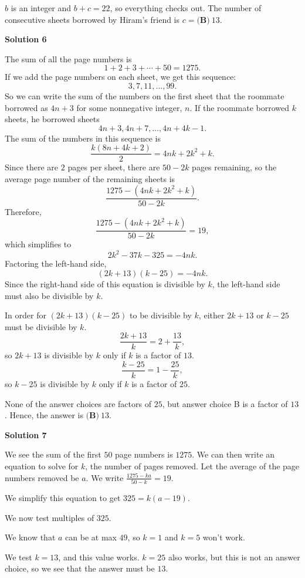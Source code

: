 \begin{enumerate}
 $b$ is an integer and $b+c=22$, so everything checks out. The number of consecutive sheets borrowed by Hiram’s friend is $c=\boxed{\textbf{(B)} ~13}$.

 



\textbf{Solution 6}

The sum of all the page numbers is
 \[1+2+3+\cdots+50 = 1275.\]If we add the page numbers on each sheet, we get this sequence:
 \[3, 7, 11, \ldots, 99.\]So we can write the sum of the numbers on the first sheet that the roommate borrowed as $4n+3$ for some nonnegative integer, $n$. If the roommate borrowed $k$ sheets, he borrowed sheets
 \[4n+3, 4n+7, \ldots, 4n+4k-1.\]The sum of the numbers in this sequence is
 \[\frac{k(8n+4k+2)}{2} = 4nk+2k^2+k.\]Since there are $2$ pages per sheet, there are $50-2k$ pages remaining, so the average page number of the remaining sheets is 
 \[\frac{1275 - (4nk+2k^2+k)}{50-2k}.\]Therefore,
 \[\frac{1275 - (4nk+2k^2+k)}{50-2k} = 19,\]which simplifies to
 \[2k^2-37k-325 = -4nk.\]Factoring the left-hand side,
 \[(2k+13)(k-25)=-4nk.\] Since the right-hand side of this equation is divisible by $k$, the left-hand side must also be divisible by $k$. 

 In order for $(2k+13)(k-25)$ to be divisible by $k$, either $2k+13$ or $k-25$ must be divisible by $k$. 
 \[\frac{2k+13}{k}=2+\frac{13}{k},\] so $2k+13$ is divisible by $k$ only if $k$ is a factor of $13$. 
 \[\frac{k-25}{k}=1-\frac{25}{k},\] so $k-25$ is divisible by $k$ only if $k$ is a factor of $25$. 

 None of the answer choices are factors of $25$, but answer choice B is a factor of $13$. Hence, the answer is $\boxed{\textbf{(B)} ~13}$.

 



\textbf{Solution 7}

We see the sum of the first $50$ page numbers is $1275$. We can then write an equation to solve for $k$, the number of pages removed. Let the average of the page numbers removed be $a$. We write $\frac{1275-ka}{50-k}=19$. 

 We simplify this equation to get $325=k(a-19)$.

 We now test multiples of $325$.

 We know that $a$ can be at max $49$, so $k=1$ and $k=5$ won't work.

 We test $k=13$, and this value works. $k=25$ also works, but this is not an answer choice, so we see that the answer must be $\boxed{13}$.


\end{enumerate}

